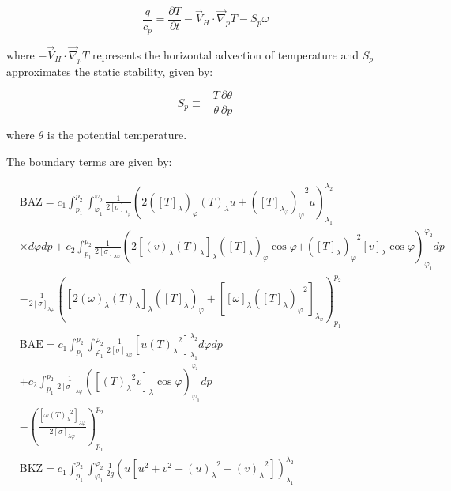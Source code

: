 \documentclass[pdflatex,sn-chicago]{sn-jnl}%
\theoremstyle{plain}
\theoremstyle{definition}
\theoremstyle{remark}
\theoremstyle{definition}
\begin{document}
\begin{equation}
    \frac{q}{c_p} = \frac{\partial T}{\partial t} - \Vec{V}_H \cdot \Vec{\nabla}_p T - S_p\omega
\end{equation}

where $-\Vec{V}_H \cdot \Vec{\nabla}_p T$ represents the horizontal advection of temperature and $S_p$ approximates the static stability, given by:

\begin{equation}
    S_p \equiv -\frac{T}{\theta}\frac{\partial \theta}{\partial p}
\end{equation}

where $\theta$ is the potential temperature. 


The boundary terms are given by:

\begin{align}
& \mathrm{BAZ}=c_1 \int_{p_1}^{p_2} \int_{\varphi_1}^{\varphi_2} \frac{1}{2[\sigma]_{\lambda_{\varphi}}}\left(2\left([T]_\lambda\right)_{\varphi}(T)_\lambda u+{\left([T]_{\lambda_{\varphi}}\right)_{\varphi}}^2 u\right)_{\lambda_1}^{\lambda_2} \nonumber \\
& \times d \varphi d p+c_2 \int_{p_1}^{p_2} \frac{1}{2[\sigma]_{\lambda \varphi}}\left(2\left[(v)_\lambda(T)_\lambda\right]_\lambda\left([T]_\lambda\right)_{\varphi} \cos \varphi \right. \left.+{\left([T]_\lambda\right)_{\varphi}}^2[v]_\lambda \cos \varphi\right)_{\varphi_1}^{\varphi_2} d p \nonumber \\
& -\frac{1}{2[\sigma]_{\lambda \varphi}}\left(\left[2(\omega)_\lambda(T)_\lambda\right]_\lambda\left([T]_\lambda\right)_{\varphi}+\left[[\omega]_\lambda{\left([T]_\lambda\right)_{\varphi}}^2\right]_{\lambda_{\varphi}}\right)_{p_1}^{p_2} \\
& \mathrm{BAE}=c_1 \int_{p_1}^{p_2} \int_{\varphi_1}^{\varphi_2} \frac{1}{2[\sigma]_{\lambda \varphi}}\left[u{(T)_\lambda}^2\right]_{\lambda_1}^{\lambda_2} d \varphi d p \nonumber \\
& +c_2 \int_{p_1}^{p_2} \frac{1}{2[\sigma]_{\lambda \varphi}}\left(\left[{(T)_\lambda}^2 v\right]_\lambda \cos \varphi\right)_{\varphi_1}^{^{\varphi_2}} d p \\
& -\left(\frac{\left[\omega{(T)_\lambda}^2\right]_{\lambda \varphi}}{2[\sigma]_{\lambda \varphi}}\right)_{p_1}^{p_2} \nonumber \\
& \mathrm{BKZ}=c_1 \int_{p_1}^{p_2} \int_{\varphi_1}^{\varphi_2} \frac{1}{2 g}\left(u\left[u^2+v^2-{(u)_\lambda}^2-{(v)_\lambda}^2\right]\right)_{\lambda_1}^{\lambda_2} \nonumber \\

\end{align}
\end{document}
